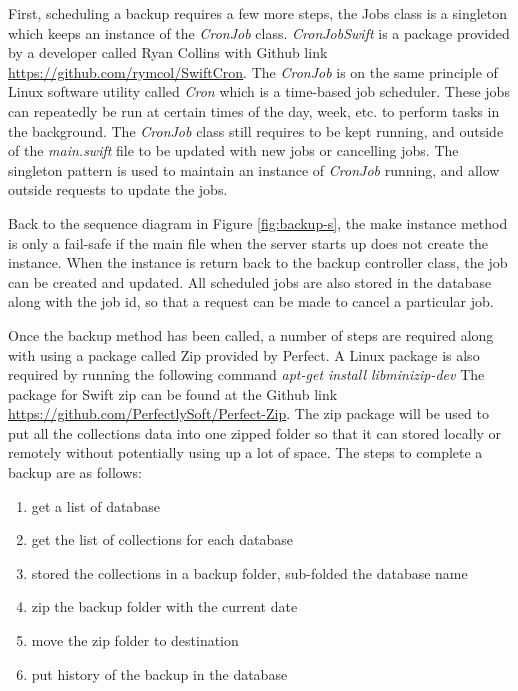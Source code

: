 First, scheduling a backup requires a few more steps, the Jobs class is a singleton which keeps an instance of the \textit{CronJob} class. \textit{CronJobSwift} is a package provided by a developer called Ryan Collins with Github link \url{https://github.com/rymcol/SwiftCron}. The \textit{CronJob} is on the same principle of Linux software utility called \textit{Cron} which is a time-based job scheduler. These jobs can repeatedly be run at certain times of the day, week, etc. to perform tasks in the background. The \textit{CronJob} class still requires to be kept running, and outside of the \textit{main.swift} file to be updated with new jobs or cancelling jobs. The singleton pattern is used to maintain an instance of \textit{CronJob} running, and allow outside requests to update the jobs.

Back to the sequence diagram in Figure \ref{fig:backup-s}, the make instance method is only a fail-safe if the main file when the server starts up does not create the instance. When the instance is return back to the backup controller class, the job can be created and updated. All scheduled jobs are also stored in the database along with the job id, so that a request can be made to cancel a particular job.

Once the backup method has been called, a number of steps are required along with using a package called Zip provided by Perfect. A Linux package is also required by running the following command \textit{apt-get install libminizip-dev} The package for Swift zip can be found at the Github link \url{https://github.com/PerfectlySoft/Perfect-Zip}. The zip package will be used to put all the collections data into one zipped folder so that it can stored locally or remotely without potentially using up a lot of space. The steps to complete a backup are as follows:

\begin{enumerate}
  \item get a list of database 
  \item get the list of collections for each database
  \item stored the collections in a backup folder, sub-folded the database name
  \item zip the backup folder with the current date
  \item move the zip folder to destination
  \item put history of the backup in the database
\end{enumerate}

